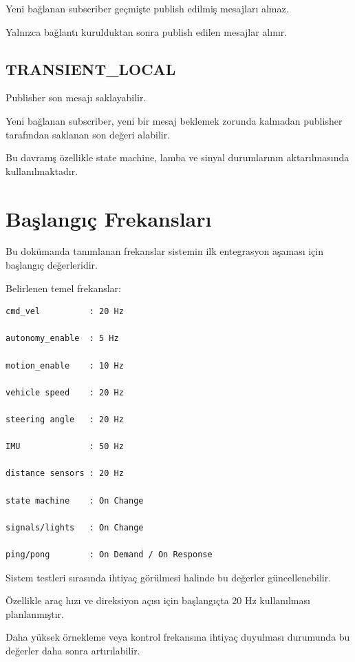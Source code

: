 \documentclass[12pt,a4paper]{article}
\begin{document}
Yeni bağlanan subscriber geçmişte publish edilmiş mesajları almaz.

Yalnızca bağlantı kurulduktan sonra publish edilen mesajlar alınır.

\subsection{TRANSIENT\_LOCAL}

Publisher son mesajı saklayabilir.

Yeni bağlanan subscriber, yeni bir mesaj beklemek zorunda kalmadan
publisher tarafından saklanan son değeri alabilir.

Bu davranış özellikle state machine, lamba ve sinyal durumlarının
aktarılmasında kullanılmaktadır.

\section{Başlangıç Frekansları}

Bu dokümanda tanımlanan frekanslar sistemin ilk entegrasyon aşaması için
başlangıç değerleridir.

Belirlenen temel frekanslar:

\begin{verbatim}
cmd_vel          : 20 Hz

autonomy_enable  : 5 Hz

motion_enable    : 10 Hz

vehicle speed    : 20 Hz

steering angle   : 20 Hz

IMU              : 50 Hz

distance sensors : 20 Hz

state machine    : On Change

signals/lights   : On Change

ping/pong        : On Demand / On Response
\end{verbatim}

Sistem testleri sırasında ihtiyaç görülmesi halinde bu değerler
güncellenebilir.

Özellikle araç hızı ve direksiyon açısı için başlangıçta 20 Hz
kullanılması planlanmıştır.

Daha yüksek örnekleme veya kontrol frekansına ihtiyaç duyulması durumunda
bu değerler daha sonra artırılabilir.
\end{document}
